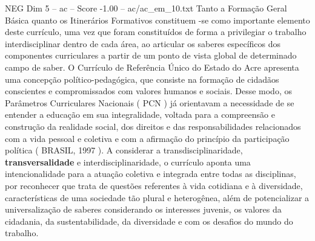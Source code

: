 \begin{textsample}{NEG Dim 5 – ac – Score -1.00 – ac/ac\_em\_10.txt}
Tanto a Formação Geral Básica quanto os Itinerários Formativos constituem -se como importante elemento deste currículo, uma vez que foram constituídos de forma a privilegiar o trabalho interdisciplinar dentro de cada área, ao articular os saberes específicos dos componentes curriculares a partir de um ponto de vista global de determinado campo de saber.
O Currículo de Referência Único do Estado do Acre apresenta uma concepção político-pedagógica, que consiste na formação de cidadãos conscientes e compromissados com valores humanos e sociais.
Desse modo, os Parâmetros Curriculares Nacionais ( PCN ) já orientavam a necessidade de se entender a educação em sua integralidade, voltada para a compreensão e construção da realidade social, dos direitos e das responsabilidades relacionados com a vida pessoal e coletiva e com a afirmação do princípio da participação política ( BRASIL, 1997 ).
A considerar a transdisciplinaridade, \textbf{transversalidade} e interdisciplinaridade, o currículo aponta uma intencionalidade para a atuação coletiva e integrada entre todas as disciplinas, por reconhecer que trata de questões referentes à vida cotidiana e à diversidade, características de uma sociedade tão plural e heterogênea, além de potencializar a universalização de saberes considerando os interesses juvenis, os valores da cidadania, da sustentabilidade, da diversidade e com os desafios do mundo do trabalho.

\end{textsample}
